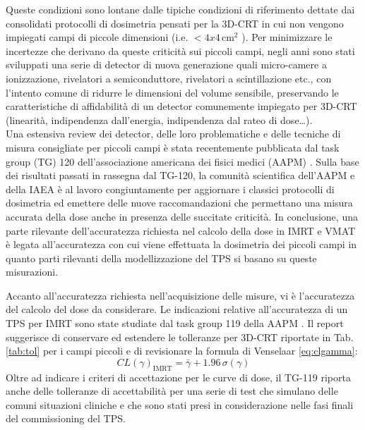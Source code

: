 Queste condizioni sono lontane dalle tipiche condizioni di riferimento dettate dai consolidati protocolli di dosimetria \cite{Almond1999,Andreo2006} pensati per la 3D-CRT in cui non vengono impiegati campi di piccole dimensioni (i.e. $<4x4\,$cm$^2$ \cite{Das2008}). Per minimizzare le incertezze che derivano da queste criticità sui piccoli campi, negli anni sono stati sviluppati una serie di detector di nuova generazione quali micro-camere a ionizzazione, rivelatori a semiconduttore, rivelatori a scintillazione etc., con l'intento comune di ridurre le dimensioni del volume sensibile, preservando le caratteristiche di affidabilità di un detector comunemente impiegato per 3D-CRT (linearità, indipendenza dall'energia, indipendenza dal rateo di dose\ldots).\\
Una estensiva review dei detector, delle loro problematiche e delle tecniche di misura consigliate per piccoli campi è stata recentemente pubblicata dal task group (TG) 120 dell'associazione americana dei fisici medici (AAPM) \cite{Low2011}. Sulla base dei risultati passati in rassegna dal TG-120, la comunità scientifica dell'AAPM e della IAEA è al lavoro congiuntamente per aggiornare i classici protocolli di dosimetria ed emettere delle nuove raccomandazioni che permettano una misura accurata della dose anche in presenza delle succitate criticità. In conclusione, una parte rilevante dell'accuratezza richiesta nel calcolo della dose in IMRT e VMAT è legata all'accuratezza con cui viene effettuata la dosimetria dei piccoli campi in quanto parti rilevanti della modellizzazione del TPS si basano su queste misurazioni.

Accanto all'accuratezza richiesta nell'acquisizione delle misure, vi è l'accuratezza del calcolo del dose da considerare. Le indicazioni relative all'accuratezza di un TPS per IMRT sono state studiate dal task group 119 della AAPM \cite{Ezzell2009}. Il report suggerisce di conservare ed estendere le tolleranze per 3D-CRT riportate in Tab.\ref{tab:tol} per i campi piccoli e di revisionare la formula di Venselaar \eqref{eq:clgamma}:
\begin{equation}
CL(\gamma)_{\text{IMRT}} = \bar{\gamma} + 1.96\,\sigma(\gamma)
\end{equation}
Oltre ad indicare i criteri di accettazione per le curve di dose, il TG-119 riporta anche delle tolleranze di accettabilità per una serie di test che simulano delle comuni situazioni cliniche e che sono stati presi in considerazione nelle fasi finali del commissioning del TPS. 

